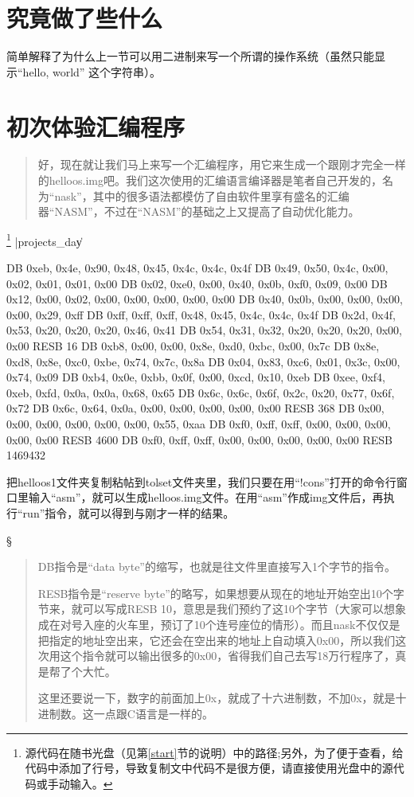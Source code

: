 \section{	究竟做了些什么	}
简单解释了为什么上一节可以用二进制来写一个所谓的操作系统（虽然只能显示“hello, world” 这个字符串）。
\section{	初次体验汇编程序	}
\begin{quote}
好，现在就让我们马上来写一个汇编程序，用它来生成一个跟刚才完全一样的helloos.img吧。我们这次使用的汇编语言编译器是笔者自己开发的，名为“nask”，其中的很多语法都模仿了自由软件里享有盛名的汇编器“NASM”，不过在“NASM”的基础之上又提高了自动优化能力。
\end{quote}

\dag \footnote{源代码在随书光盘（见第\ref{start}节的说明）中的路径;另外，为了便于查看，给代码中添加了行号，导致复制文中代码不是很方便，请直接使用光盘中的源代码或手动输入。}
|projects_day\|
\begin{code}[label=helloos.nas]
    DB	0xeb, 0x4e, 0x90, 0x48, 0x45, 0x4c, 0x4c, 0x4f
	DB	0x49, 0x50, 0x4c, 0x00, 0x02, 0x01, 0x01, 0x00
	DB	0x02, 0xe0, 0x00, 0x40, 0x0b, 0xf0, 0x09, 0x00
	DB	0x12, 0x00, 0x02, 0x00, 0x00, 0x00, 0x00, 0x00
	DB	0x40, 0x0b, 0x00, 0x00, 0x00, 0x00, 0x29, 0xff
	DB	0xff, 0xff, 0xff, 0x48, 0x45, 0x4c, 0x4c, 0x4f
	DB	0x2d, 0x4f, 0x53, 0x20, 0x20, 0x20, 0x46, 0x41
	DB	0x54, 0x31, 0x32, 0x20, 0x20, 0x20, 0x00, 0x00
	RESB	16
	DB	0xb8, 0x00, 0x00, 0x8e, 0xd0, 0xbc, 0x00, 0x7c
	DB	0x8e, 0xd8, 0x8e, 0xc0, 0xbe, 0x74, 0x7c, 0x8a
	DB	0x04, 0x83, 0xc6, 0x01, 0x3c, 0x00, 0x74, 0x09
	DB	0xb4, 0x0e, 0xbb, 0x0f, 0x00, 0xcd, 0x10, 0xeb
	DB	0xee, 0xf4, 0xeb, 0xfd, 0x0a, 0x0a, 0x68, 0x65
	DB	0x6c, 0x6c, 0x6f, 0x2c, 0x20, 0x77, 0x6f, 0x72
	DB	0x6c, 0x64, 0x0a, 0x00, 0x00, 0x00, 0x00, 0x00
	RESB	368
	DB	0x00, 0x00, 0x00, 0x00, 0x00, 0x00, 0x55, 0xaa
	DB	0xf0, 0xff, 0xff, 0x00, 0x00, 0x00, 0x00, 0x00
	RESB	4600
	DB	0xf0, 0xff, 0xff, 0x00, 0x00, 0x00, 0x00, 0x00
	RESB	1469432
\end{code}

把helloos1文件夹复制粘帖到tolset文件夹里，我们只要在用“!cons”打开的命令行窗口里输入“asm”，就可以生成helloos.img文件。在用“asm”作成img文件后，再执行“run”指令，就可以得到与刚才一样的结果。
\begin{center}
\S
\end{center}
\begin{quote}
DB指令是“data byte”的缩写，也就是往文件里直接写入1个字节的指令。

RESB指令是“reserve byte”的略写，如果想要从现在的地址开始空出10个字节来，就可以写成RESB 10，意思是我们预约了这10个字节（大家可以想象成在对号入座的火车里，预订了10个连号座位的情形）。而且nask不仅仅是把指定的地址空出来，它还会在空出来的地址上自动填入0x00，所以我们这次用这个指令就可以输出很多的0x00，省得我们自己去写18万行程序了，真是帮了个大忙。

这里还要说一下，数字的前面加上0x，就成了十六进制数，不加0x，就是十进制数。这一点跟C语言是一样的。
\end{quote}

